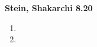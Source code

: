 \textbf{Stein, Shakarchi 8.20}

\begin{enumerate}
    \item 
    \pagebreak
    \item 
\end{enumerate}
